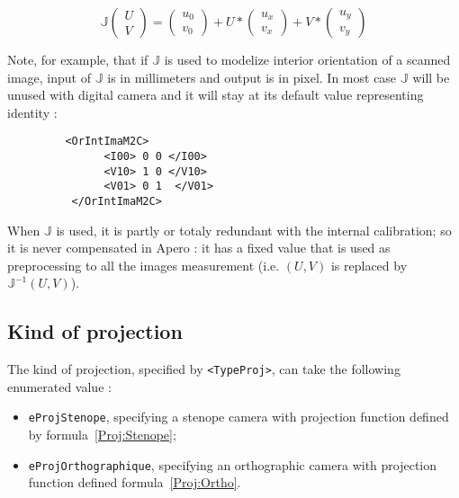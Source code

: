 \begin{equation}
  \mathbb{J}  \begin{pmatrix} U \\ V \end{pmatrix}
              = \begin{pmatrix} u_0 \\ v_0 \end{pmatrix}
               + U * \begin{pmatrix} u_x \\ v_x \end{pmatrix}
               + V * \begin{pmatrix} u_y \\ v_y \end{pmatrix}
\end{equation}

Note, for example, that if $\mathbb{J}$ is used to modelize interior orientation
of a scanned image, input of  $\mathbb{J}$  is in millimeters and output is in pixel.
In most case $\mathbb{J}$ will be unused with digital camera and it will stay at
its default value representing identity :

\begin{verbatim}
         <OrIntImaM2C>
               <I00> 0 0 </I00>
               <V10> 1 0 </V10>
               <V01> 0 1  </V01>
          </OrIntImaM2C>
\end{verbatim}

When  $\mathbb{J}$  is used, it is partly or totaly redundant with the internal
calibration; so it is never compensated in Apero : it has a fixed value that is used
as preprocessing to all the images measurement (i.e. $(U,V)$ is replaced by
 $\mathbb{J}^{-1}(U,V)$).




\subsection{Kind of projection}

The kind of projection,  specified by  {\tt <TypeProj>}, can take the following
enumerated value :

\begin{itemize}
   \item {\tt eProjStenope}, specifying a stenope camera with projection function defined
         by formula~\ref{Proj:Stenope};

   \item {\tt eProjOrthographique}, specifying an orthographic camera with projection function defined
         formula~\ref{Proj:Ortho}.

\end{itemize}


